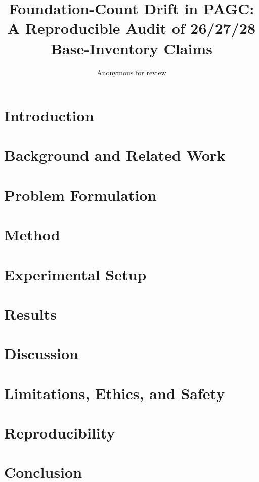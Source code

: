 \documentclass[manuscript]{acmart}
\title{Foundation-Count Drift in PAGC: A Reproducible Audit of 26/27/28 Base-Inventory Claims}
\author{Anonymous for review}
\affiliation{\institution{Independent research archive}\city{Enugu}\country{Nigeria}}
\begin{document}
\begin{abstract}

\end{abstract}


\maketitle

\section{Introduction}


\section{Background and Related Work}


\section{Problem Formulation}


\section{Method}


\section{Experimental Setup}


\section{Results}


\section{Discussion}


\section{Limitations, Ethics, and Safety}


\section{Reproducibility}


\section{Conclusion}





\appendix

\end{document}
